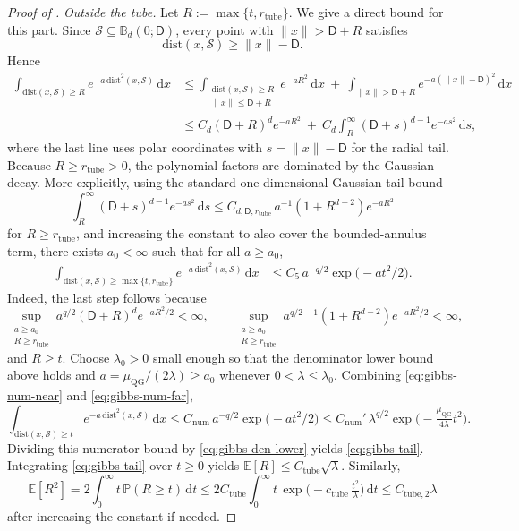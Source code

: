 \documentclass{article}
\theoremstyle{normaltheorem}
\newcommand{\ud}{\mathrm{d}}
\begin{document}
\begin{proof}[Proof of ]
\emph{Outside the tube.}
Let \(R:=\max\{t,r_{\mathrm{tube}}\}\). We give a direct bound for this part. Since
\(\mathcal S\subseteq\mathbb B_d(0;\mathsf D)\), every point with \(\|x\|>\mathsf D+R\) satisfies
\[
\mathrm{dist}(x,\mathcal S)\ge \|x\|-\mathsf D.
\]
Hence
\begin{align*}
\int_{\mathrm{dist}(x,\mathcal S)\ge R}
e^{-a\,\mathrm{dist}^2(x,\mathcal S)}\,\ud x
&\le
\int_{\substack{\mathrm{dist}(x,\mathcal S)\ge R\\ \|x\|\le \mathsf D+R}}
e^{-aR^2}\,\ud x
\ +\
\int_{\|x\|>\mathsf D+R}
e^{-a(\|x\|-\mathsf D)^2}\,\ud x  \\
&\le
C_d(\mathsf D+R)^d e^{-aR^2}
\ +\
C_d\int_R^\infty (\mathsf D+s)^{d-1}e^{-a s^2}\,\ud s,
\end{align*}
where the last line uses polar coordinates with \(s=\|x\|-\mathsf D\) for the radial tail.
Because \(R\ge r_{\mathrm{tube}}>0\), the polynomial factors are dominated by the Gaussian decay. More explicitly, using
the standard one-dimensional Gaussian-tail bound
\[
\int_R^\infty (\mathsf D+s)^{d-1}e^{-a s^2}\,\ud s
\le C_{d,\mathsf D,r_{\mathrm{tube}}}\,a^{-1}(1+R^{d-2})e^{-aR^2}
\]
for \(R\ge r_{\mathrm{tube}}\), and increasing the constant to also cover the bounded-annulus term, there exists
\(a_0<\infty\) such that for all \(a\ge a_0\),
\begin{align}
\int_{\mathrm{dist}(x,\mathcal S)\ge \max\{t,r_{\mathrm{tube}}\}}
e^{-a\,\mathrm{dist}^2(x,\mathcal S)}\,\ud x
&\le C_5\,a^{-q/2}\exp\!\big(-a t^2/2\big).
\label{eq:gibbs-num-far}
\end{align}
Indeed, the last step follows because
\[
\sup_{\substack{a\ge a_0\\ R\ge r_{\mathrm{tube}}}}
a^{q/2}(\mathsf D+R)^d e^{-aR^2/2}
<\infty,
\qquad
\sup_{\substack{a\ge a_0\\ R\ge r_{\mathrm{tube}}}}
a^{q/2-1}(1+R^{d-2}) e^{-aR^2/2}
<\infty,
\]
and \(R\ge t\).
Choose \(\lambda_0>0\) small enough so that the denominator lower bound above holds and
\(a=\mu_{\mathrm{QG}}/(2\lambda)\ge a_0\) whenever \(0<\lambda\le\lambda_0\).
Combining \eqref{eq:gibbs-num-near} and \eqref{eq:gibbs-num-far},
\[
\int_{\mathrm{dist}(x,\mathcal{S})\ge t} e^{-a\,\mathrm{dist}^2(x,\mathcal{S})}\,\ud x
\le C_{\mathrm{num}}\,a^{-q/2}\exp\!\big(-a t^2/2\big)
\le C_{\mathrm{num}}'\,\lambda^{q/2}\exp\!\Big(-\tfrac{\mu_{\mathrm{QG}}}{4\lambda}t^2\Big).
\]
Dividing this numerator bound by \eqref{eq:gibbs-den-lower} yields \eqref{eq:gibbs-tail}.
Integrating \eqref{eq:gibbs-tail} over $t\ge 0$ yields $\mathbb E[R]\le C_{\mathrm{tube}}\sqrt{\lambda}$.
Similarly,
\[
\mathbb E[R^2]
=2\int_0^\infty t\,\mathbb P(R\ge t)\,\ud t
\le
2C_{\mathrm{tube}}\int_0^\infty t\,\exp\!\Big(-c_{\mathrm{tube}}\,\tfrac{t^2}{\lambda}\Big)\,\ud t
\le C_{\mathrm{tube},2}\lambda
\]
after increasing the constant if needed.


\end{proof}
\end{document}
